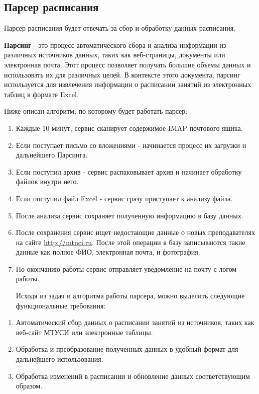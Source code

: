 \subsection{Парсер расписания}
Парсер расписания будет отвечать за сбор и обработку данных расписания.

\textbf{Парсинг} - это процесс автоматического сбора и анализа информации из различных источников данных, 
таких как веб-страницы, документы или электронная почта. 
Этот процесс позволяет получать большие объемы данных и использовать их для различных целей.
В контексте этого документа, парсинг используется для извлечения информации о 
расписании занятий из электронных таблиц в формате Excel.

Ниже описан алгоритм, по которому будет работать парсер:
\begin{enumerate}
  \item Каждые 10 минут, сервис сканирует содержимое IMAP почтового ящика.
  \item Если поступает письмо со вложениями - начинается процесс их загрузки и дальнейшего Парсинга.
  \item Если поступил архив - сервис распаковывает архив и начинает обработку файлов внутри него.
  \item Если поступил файл Excel - сервис сразу приступает к анализу файла.
  \item После анализа сервис сохраняет полученную информацию в базу данных.
  \item После сохранения сервис ищет недостающие данные о новых преподавателях на сайте 
\url{http://mtuci.ru}. После этой операции в базу записываются такие данные как полное ФИО, 
электронная почта, и фотография.
  \item По окончанию работы сервис отправляет уведомление на почту с логом работы.

Исходя из задач и алгоритма работы парсера, можно выделить следующие функциональные требования:
\end{enumerate}
\begin{enumerate}
  \item Автоматический сбор данных о расписании занятий из источников, таких как веб-сайт МТУСИ или электронные таблицы.
  \item Обработка и преобразование полученных данных в удобный формат для дальнейшего использования.
  \item Обработка изменений в расписании и обновление данных соответствующим образом.
\end{enumerate}

